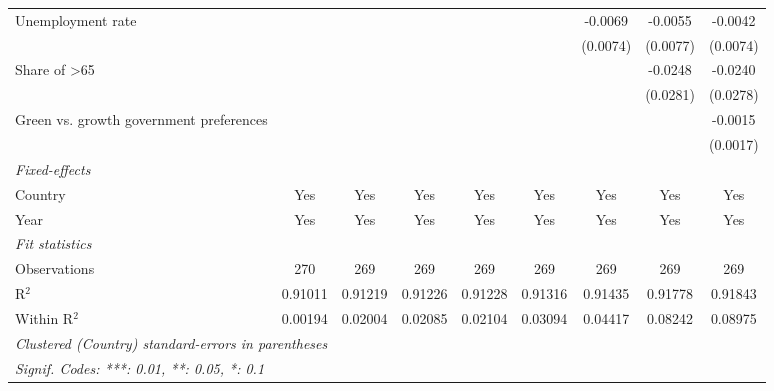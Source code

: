 \begin{table}[htbp]
\begin{tabular}{lcccccccc}
      Unemployment rate                                              &          &          &          &          &          & -0.0069  & -0.0055  & -0.0042\\   
                                                                     &          &          &          &          &          & (0.0074) & (0.0077) & (0.0074)\\   
      Share of >65                                                   &          &          &          &          &          &          & -0.0248  & -0.0240\\   
                                                                     &          &          &          &          &          &          & (0.0281) & (0.0278)\\   
      Green vs. growth government preferences                        &          &          &          &          &          &          &          & -0.0015\\   
                                                                     &          &          &          &          &          &          &          & (0.0017)\\   
      \midrule
      \emph{Fixed-effects}\\
      Country                                                        & Yes      & Yes      & Yes      & Yes      & Yes      & Yes      & Yes      & Yes\\  
      Year                                                           & Yes      & Yes      & Yes      & Yes      & Yes      & Yes      & Yes      & Yes\\  
      \midrule
      \emph{Fit statistics}\\
      Observations                                                   & 270      & 269      & 269      & 269      & 269      & 269      & 269      & 269\\  
      R$^2$                                                          & 0.91011  & 0.91219  & 0.91226  & 0.91228  & 0.91316  & 0.91435  & 0.91778  & 0.91843\\  
      Within R$^2$                                                   & 0.00194  & 0.02004  & 0.02085  & 0.02104  & 0.03094  & 0.04417  & 0.08242  & 0.08975\\  
      \midrule \midrule
      \multicolumn{9}{l}{\emph{Clustered (Country) standard-errors in parentheses}}\\
      \multicolumn{9}{l}{\emph{Signif. Codes: ***: 0.01, **: 0.05, *: 0.1}}\\
   \end{tabular}
\end{table}


